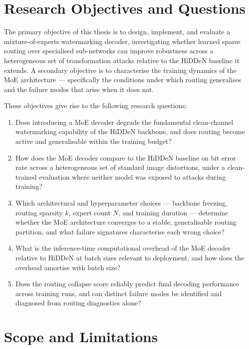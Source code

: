 ﻿\documentclass[12pt, a4paper, twoside]{report}
\numberwithin{equation}{chapter}
\begin{document}
\section{Research Objectives and Questions}
 
The primary objective of this thesis is to design, implement, and evaluate a mixture-of-experts watermarking decoder, investigating whether learned sparse routing over specialised sub-networks can improve robustness across a heterogeneous set of transformation attacks relative to the HiDDeN baseline it extends. A secondary objective is to characterise the training dynamics of the MoE architecture --- specifically the conditions under which routing generalises and the failure modes that arise when it does not.
 
These objectives give rise to the following research questions:
 
\begin{enumerate}
    \item Does introducing a MoE decoder degrade the fundamental clean-channel watermarking capability of the HiDDeN backbone, and does routing become active and generalisable within the training budget?
    \item How does the MoE decoder compare to the HiDDeN baseline on bit error rate across a heterogeneous set of standard image distortions, under a clean-trained evaluation where neither model was exposed to attacks during training?
    \item Which architectural and hyperparameter choices --- backbone freezing, routing sparsity $k$, expert count $N$, and training duration --- determine whether the MoE architecture converges to a stable, generalisable routing partition, and what failure signatures characterise each wrong choice?
    \item What is the inference-time computational overhead of the MoE decoder relative to HiDDeN at batch sizes relevant to deployment, and how does the overhead amortise with batch size?
    \item Does the routing collapse score reliably predict final decoding performance across training runs, and can distinct failure modes be identified and diagnosed from routing diagnostics alone?
\end{enumerate}
 
\section{Scope and Limitations}
 
\end{document}
